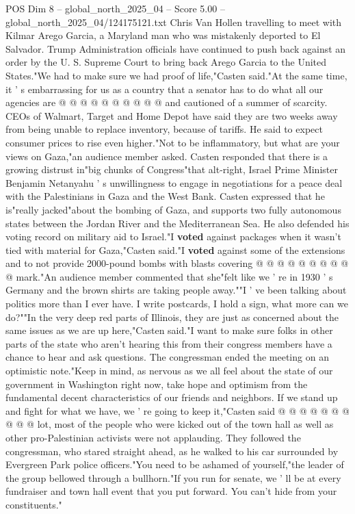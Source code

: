 \begin{textsample}{POS Dim 8 – global\_north\_2025\_04 – Score 5.00 – global\_north\_2025\_04/124175121.txt}
Chris Van Hollen travelling to meet with Kilmar Arego Garcia, a Maryland man who was mistakenly deported to El Salvador.
Trump Administration officials have continued to push back against an order by the U.
S.
Supreme Court to bring back Arego Garcia to the United States."We had to make sure we had proof of life,"Casten said."At the same time, it ' s embarrassing for us as a country that a senator has to do what all our agencies are @ @ @ @ @ @ @ @ @ @ and cautioned of a summer of scarcity.
CEOs of Walmart, Target and Home Depot have said they are two weeks away from being unable to replace inventory, because of tariffs.
He said to expect consumer prices to rise even higher."Not to be inflammatory, but what are your views on Gaza,"an audience member asked.
Casten responded that there is a growing distrust in"big chunks of Congress"that alt-right, Israel Prime Minister Benjamin Netanyahu ' s unwillingness to engage in negotiations for a peace deal with the Palestinians in Gaza and the West Bank.
Casten expressed that he is"really jacked"about the bombing of Gaza, and supports two fully autonomous states between the Jordan River and the Mediterranean Sea.
He also defended his voting record on military aid to Israel."I \textbf{voted} against packages when it wasn't tied with material for Gaza,"Casten said."I \textbf{voted} against some of the extensions and to not provide 2000-pound bombs with blasts covering @ @ @ @ @ @ @ @ @ @ mark."An audience member commented that she"felt like we ' re in 1930 ' s Germany and the brown shirts are taking people away.""I ' ve been talking about politics more than I ever have.
I write postcards, I hold a sign, what more can we do?""In the very deep red parts of Illinois, they are just as concerned about the same issues as we are up here,"Casten said."I want to make sure folks in other parts of the state who aren't hearing this from their congress members have a chance to hear and ask questions.
The congressman ended the meeting on an optimistic note."Keep in mind, as nervous as we all feel about the state of our government in Washington right now, take hope and optimism from the fundamental decent characteristics of our friends and neighbors.
If we stand up and fight for what we have, we ' re going to keep it,"Casten said @ @ @ @ @ @ @ @ @ @ lot, most of the people who were kicked out of the town hall as well as other pro-Palestinian activists were not applauding.
They followed the congressman, who stared straight ahead, as he walked to his car surrounded by Evergreen Park police officers."You need to be ashamed of yourself,"the leader of the group bellowed through a bullhorn."If you run for senate, we ' ll be at every fundraiser and town hall event that you put forward.
You can't hide from your constituents."

\end{textsample}
